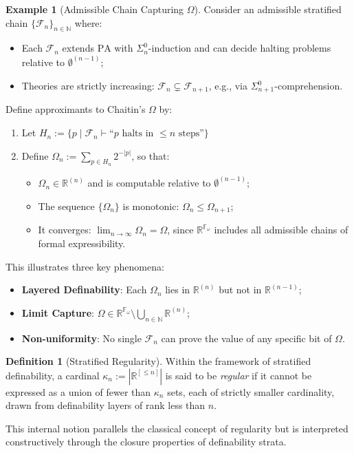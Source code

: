 \documentclass[12pt]{article}
\theoremstyle{definition}
\newtheorem{definition}{Definition}[section]
\newtheorem{example}{Example}[section]
\theoremstyle{plain}
\theoremstyle{remark}
\begin{document}
\begin{example}[Admissible Chain Capturing \( \Omega \)]
\label{ex:omega-chain}
Consider an admissible stratified chain \( \{\mathcal{F}_n\}_{n \in \mathbb{N}} \) where:
\begin{itemize}
    \item Each \( \mathcal{F}_n \) extends \( \mathrm{PA} \) with \( \Sigma^0_n \)-induction and can decide halting problems relative to \( \emptyset^{(n-1)} \);
    \item Theories are strictly increasing: \( \mathcal{F}_n \subsetneq \mathcal{F}_{n+1} \), e.g., via \( \Sigma^0_{n+1} \)-comprehension.
\end{itemize}

Define approximants to Chaitin's \( \Omega \) by:
\begin{enumerate}
    \item Let \( H_n := \{ p \mid \mathcal{F}_n \vdash \text{“$p$ halts in } \leq n \text{ steps”} \} \)
    \item Define \( \Omega_n := \sum_{p \in H_n} 2^{-|p|} \), so that:
    \begin{itemize}
        \item \( \Omega_n \in \mathbb{R}^{(n)} \) and is computable relative to \( \emptyset^{(n-1)} \);
        \item The sequence \( \{ \Omega_n \} \) is monotonic: \( \Omega_n \leq \Omega_{n+1} \);
        \item It converges: \( \lim_{n \to \infty} \Omega_n = \Omega \), since \( \mathbb{R}^{\mathbb{F}_\omega} \) includes all admissible chains of formal expressibility.
    \end{itemize}
\end{enumerate}

This illustrates three key phenomena:
\begin{itemize}
    \item \textbf{Layered Definability}: Each \( \Omega_n \) lies in \( \mathbb{R}^{(n)} \) but not in \( \mathbb{R}^{(n-1)} \);
    \item \textbf{Limit Capture}: \( \Omega \in \mathbb{R}^{\mathbb{F}_\omega} \setminus \bigcup_{n\in\mathbb{N}} \mathbb{R}^{(n)} \);
    \item \textbf{Non-uniformity}: No single \( \mathcal{F}_n \) can prove the value of any specific bit of \( \Omega \).
\end{itemize}
\end{example}

\begin{definition}[Stratified Regularity]
\label{def:stratified-regularity}
Within the framework of stratified definability, a cardinal \( \kappa_n := \left| \mathbb{R}^{[\leq n]} \right| \) is said to be \emph{regular} if it cannot be expressed as a union of fewer than \( \kappa_n \) sets, each of strictly smaller cardinality, drawn from definability layers of rank less than \( n \).

This internal notion parallels the classical concept of regularity but is interpreted constructively through the closure properties of definability strata.
\end{definition}
\end{document}
